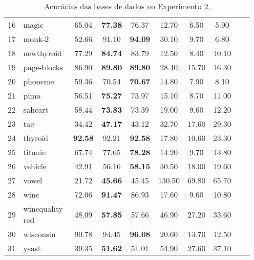 \begin{table}[H]
\begin{centering}
\begin{tabular}{rlcccccccc}
  16 & magic & 65.04 & \textbf{77.38} & 76.37 & 12.70 & 6.50 & \cellcolor[gray]{0.85}5.90 \\
  17 & monk-2 & 52.66 & 91.10 & \textbf{94.09} & 30.10 & 9.70 & \cellcolor[gray]{0.85}6.80 \\
  18 & newthyroid & 77.29 & \textbf{84.74} & 83.79 & 12.50 & \cellcolor[gray]{0.85}8.40 & 10.10 \\
  19 & page-blocks & 86.90 & \textbf{89.80} & \textbf{89.80} & 28.40 & \cellcolor[gray]{0.85}15.70 & 16.30 \\
  20 & phoneme & 59.36 & 70.54 & \textbf{70.67} & 14.80 & \cellcolor[gray]{0.85}7.90 & 8.10 \\
  21 & pima & 56.51 & \textbf{75.27} & 73.97 & 15.10 & \cellcolor[gray]{0.85}8.70 & 11.00 \\
  22 & saheart & 58.44 & \textbf{73.83} & 73.39 & 19.00 & \cellcolor[gray]{0.85}9.60 & 12.20 \\
  23 & tae & 34.42 & \textbf{47.17} & 43.12 & 32.70 & \cellcolor[gray]{0.85}17.60 & 29.30 \\
  24 & thyroid & \textbf{92.58} & 92.21 & \textbf{92.58} & 17.80 & \cellcolor[gray]{0.85}10.60 & 23.30 \\
  25 & titanic & 67.74 & 77.65 & \textbf{78.28} & 14.20 & \cellcolor[gray]{0.85}9.70 & 13.80 \\
  26 & vehicle & 42.91 & 56.16 & \textbf{58.15} & 30.50 & \cellcolor[gray]{0.85}18.00 & 19.60 \\
  27 & vowel & 21.72 & \textbf{45.66} & 45.45 & 130.50 & 69.80 & \cellcolor[gray]{0.85}65.70 \\
  28 & wine & 72.06 & \textbf{91.47} & 86.93 & 17.60 & \cellcolor[gray]{0.85}9.60 & 10.80 \\
  29 & winequality-red & 48.09 & \textbf{57.85} & 57.66 & 46.90 & \cellcolor[gray]{0.85}27.20 & 33.60 \\
  30 & wisconsin & 90.78 & 94.45 & \textbf{96.08} & 20.60 & 13.70 & \cellcolor[gray]{0.85}12.50 \\
  31 & yeast & 39.35 & \textbf{51.62} & 51.01 & 54.90 & \cellcolor[gray]{0.85}27.60 & 37.10 \\
   \bottomrule
\end{tabular}
\par\end{centering}


\protect\caption{Acurácias das bases de dados no Experimento 2.}
\label{Exp2Ac-Nr}
\end{table}